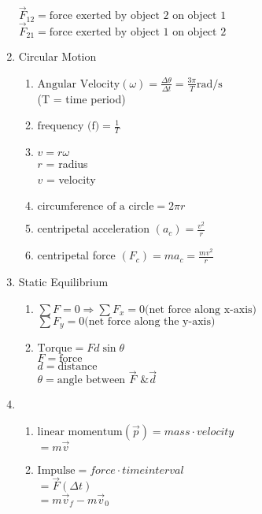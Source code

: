 \documentclass[12pt, letterpaper]{article}
\begin{document}
\begin{enumerate}
              $\overrightarrow F_{1 2} = \text{force exerted by object 2 on object 1}$\\
              $\overrightarrow F_{2 1} = \text{force exerted by object 1 on object 2}$
        \item Circular Motion
        \begin{enumerate}
          \item $\text{Angular Velocity} (\omega) = \frac{\Delta \theta}{\Delta t} = \frac{3\pi}{T} \text{rad/s}$\\
          (T = time period)
          \item $\text{frequency (f)} = \frac{1}{T}$
          \item $v = r\omega$\\
          $r$ = radius\\
          $v$ = velocity
          \item $\text{circumference of a circle} = 2\pi r$
          \item centripetal acceleration $(a_c) = \frac{v^2}{r}$
          \item centripetal force $(F_c) = ma_c = \frac{mv^2}{r}$
        \end{enumerate}
        \item Static Equilibrium
        \begin{enumerate}
          \item $\sum F = 0 \Rightarrow \sum F_x = 0 \text{(net force along x-axis)}$\\
          $\sum F_y = 0 \text{(net force along the y-axis)}$
          \item $\text{Torque} = F d \sin \theta$\\
          $F = \text{force}$\\
          $d = \text{distance}$\\
          $\theta = \text{angle between $\overrightarrow F$ \& $\overrightarrow d$}$
        \end{enumerate}
        \item
        \begin{enumerate}
          \item $\text{linear momentum} (\overrightarrow p) = mass \cdot velocity$\\
          $= m \overrightarrow v$
          \item $\text{Impulse} = force \cdot time interval$\\
          $= \overrightarrow F (\Delta t)$\\
          $= m \overrightarrow v_f - m \overrightarrow v_0$\\

\end{enumerate}
\end{enumerate}
\end{document}

